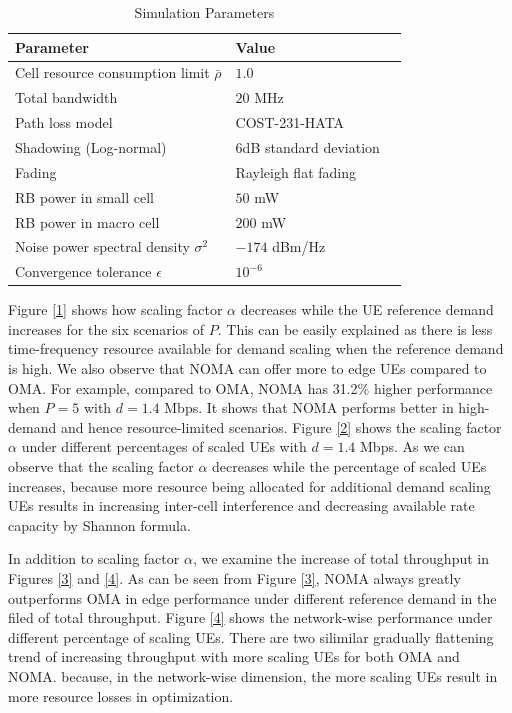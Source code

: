 \documentclass[10pt,journal,final,finalsubmission,twocolumn]{IEEEtran}
\begin{document}
\begin{table}[htbp]
 \caption{\label{tab:test}Simulation Parameters}
 \begin{center}
 \begin{tabular}{lll}
  \toprule
  \textbf{Parameter} & \textbf{Value}  \\
  \midrule
 Cell resource consumption limit $\bar{\rho}$ & $1.0$  \\
 Total bandwidth & $20$ MHz  \\
 Path loss model & COST-231-HATA\\
 Shadowing (Log-normal) &$6$dB standard deviation\\
 Fading &Rayleigh flat fading\\
 RB power in small cell & $50$ mW \\
 RB power in macro cell & $200$ mW \\
  Noise power spectral density $\sigma ^2$ & $-174$ dBm/Hz  \\
 Convergence tolerance $\epsilon$ & $10^{-6}$ \\

  \bottomrule
 \end{tabular}
  \end{center}
\end{table}


Figure \ref{1} shows how scaling factor $\alpha$ decreases while the UE reference demand increases for the six scenarios of $P$. This can be easily explained as there is less time-frequency resource available for demand scaling when the reference demand is high. We also observe that NOMA can offer more to edge UEs compared to OMA. For example, compared to OMA, NOMA has 31.2\% higher performance when $P=5$ with $d=1.4$ Mbps. It shows that NOMA performs better in high-demand and hence resource-limited scenarios. Figure \ref{2} shows the scaling factor $\alpha $ under different percentages of scaled UEs with $d = 1.4$ Mbps. As we can observe that the scaling factor $\alpha$ decreases while the percentage of scaled UEs increases, because more resource being allocated for additional demand scaling UEs results in increasing inter-cell interference and decreasing available rate capacity by Shannon formula.  

In addition to scaling factor $\alpha$, we examine the increase of total throughput in Figures \ref{3} and \ref{4}. As can be seen from Figure \ref{3}, NOMA always greatly outperforms OMA in edge performance under different reference demand in the filed of total throughput. Figure \ref{4} shows the network-wise performance under different percentage of scaling UEs. There are two silimilar gradually flattening trend of increasing throughput with more scaling UEs for both OMA and NOMA. because, in the network-wise dimension, the more scaling UEs result in more resource losses in optimization.
\end{document}
